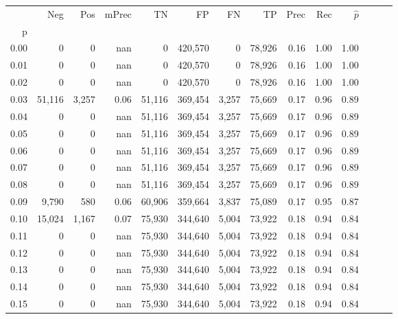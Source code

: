 \begin{tabular}{rrrrrrrrrrrrrr}
\toprule
{} &     Neg &    Pos & mPrec &       TN &       FP &      FN &      TP &  Prec &   Rec & $\hat{p}$ \\
p    &         &        &       &          &          &         &         &       &       &           \\
\midrule
0.00 &       0 &      0 &   nan &        0 &  420,570 &       0 &  78,926 &  0.16 &  1.00 &      1.00 \\
0.01 &       0 &      0 &   nan &        0 &  420,570 &       0 &  78,926 &  0.16 &  1.00 &      1.00 \\
0.02 &       0 &      0 &   nan &        0 &  420,570 &       0 &  78,926 &  0.16 &  1.00 &      1.00 \\
0.03 &  51,116 &  3,257 &  0.06 &   51,116 &  369,454 &   3,257 &  75,669 &  0.17 &  0.96 &      0.89 \\
0.04 &       0 &      0 &   nan &   51,116 &  369,454 &   3,257 &  75,669 &  0.17 &  0.96 &      0.89 \\
0.05 &       0 &      0 &   nan &   51,116 &  369,454 &   3,257 &  75,669 &  0.17 &  0.96 &      0.89 \\
0.06 &       0 &      0 &   nan &   51,116 &  369,454 &   3,257 &  75,669 &  0.17 &  0.96 &      0.89 \\
0.07 &       0 &      0 &   nan &   51,116 &  369,454 &   3,257 &  75,669 &  0.17 &  0.96 &      0.89 \\
0.08 &       0 &      0 &   nan &   51,116 &  369,454 &   3,257 &  75,669 &  0.17 &  0.96 &      0.89 \\
0.09 &   9,790 &    580 &  0.06 &   60,906 &  359,664 &   3,837 &  75,089 &  0.17 &  0.95 &      0.87 \\
0.10 &  15,024 &  1,167 &  0.07 &   75,930 &  344,640 &   5,004 &  73,922 &  0.18 &  0.94 &      0.84 \\
0.11 &       0 &      0 &   nan &   75,930 &  344,640 &   5,004 &  73,922 &  0.18 &  0.94 &      0.84 \\
0.12 &       0 &      0 &   nan &   75,930 &  344,640 &   5,004 &  73,922 &  0.18 &  0.94 &      0.84 \\
0.13 &       0 &      0 &   nan &   75,930 &  344,640 &   5,004 &  73,922 &  0.18 &  0.94 &      0.84 \\
0.14 &       0 &      0 &   nan &   75,930 &  344,640 &   5,004 &  73,922 &  0.18 &  0.94 &      0.84 \\
0.15 &       0 &      0 &   nan &   75,930 &  344,640 &   5,004 &  73,922 &  0.18 &  0.94 &      0.84 \\

\end{tabular}
